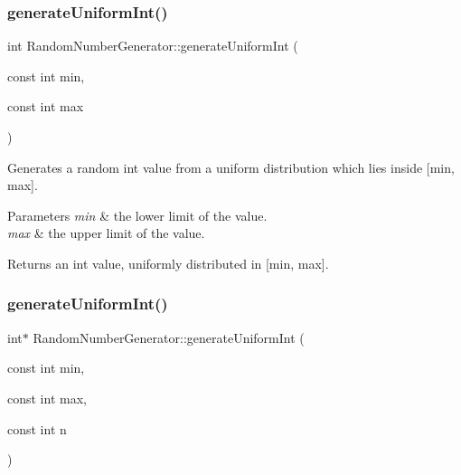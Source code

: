 \subsubsection{\texorpdfstring{generateUniformInt()}{generateUniformInt()}\hspace{0.1cm}{\footnotesize\ttfamily [1/2]}}
{\footnotesize\ttfamily int Random\+Number\+Generator\+::generate\+Uniform\+Int (\begin{DoxyParamCaption}\item[{const int}]{min,  }\item[{const int}]{max }\end{DoxyParamCaption})}

Generates a random int value from a uniform distribution which lies inside \mbox{[}min, max\mbox{]}. 
\begin{DoxyParams}{Parameters}
{\em min} & the lower limit of the value. \\
\hline
{\em max} & the upper limit of the value. \\
\hline
\end{DoxyParams}
\begin{DoxyReturn}{Returns}
an int value, uniformly distributed in \mbox{[}min, max\mbox{]}. 
\end{DoxyReturn}
\mbox{\label{class_random_number_generator_a5a3645c649783d3208319a016f744c5f}} 
\subsubsection{\texorpdfstring{generateUniformInt()}{generateUniformInt()}\hspace{0.1cm}{\footnotesize\ttfamily [2/2]}}
{\footnotesize\ttfamily int$\ast$ Random\+Number\+Generator\+::generate\+Uniform\+Int (\begin{DoxyParamCaption}\item[{const int}]{min,  }\item[{const int}]{max,  }\item[{const int}]{n }\end{DoxyParamCaption})}


